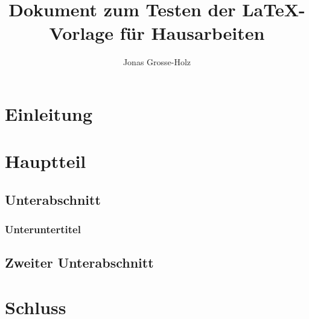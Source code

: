 \documentclass{tubsphilha}
\author{Jonas Grosse-Holz}
\title{Dokument zum Testen der \LaTeX-Vorlage für Hausarbeiten}
\begin{document}
\maketitle
\tableofcontents
\thispagestyle{empty}
\newpage
\section{Einleitung}
\lipsum[1] \parencite{book}
\section{Hauptteil}
\lipsum[2]
\subsection{Unterabschnitt}
\lipsum[6]
\subsubsection{Unteruntertitel}
\lipsum[3]
\subsection{Zweiter Unterabschnitt}
\lipsum[4]
\section{Schluss}
\lipsum[5]
\newpage
\printbibliography[heading=bibintoc]
\newpage
\statement
\end{document}
